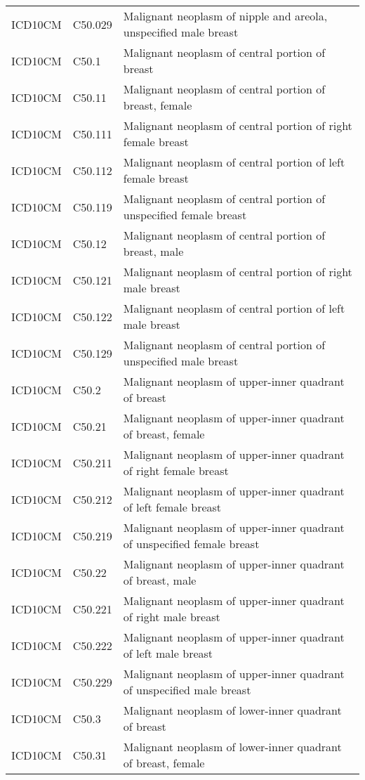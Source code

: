 \begin{table}[ht]
\begin{tabular}{lll}
  ICD10CM & C50.029 & Malignant neoplasm of nipple and areola, unspecified male breast \\ 
  ICD10CM & C50.1 & Malignant neoplasm of central portion of breast \\ 
  ICD10CM & C50.11 & Malignant neoplasm of central portion of breast, female \\ 
  ICD10CM & C50.111 & Malignant neoplasm of central portion of right female breast \\ 
  ICD10CM & C50.112 & Malignant neoplasm of central portion of left female breast \\ 
  ICD10CM & C50.119 & Malignant neoplasm of central portion of unspecified female breast \\ 
  ICD10CM & C50.12 & Malignant neoplasm of central portion of breast, male \\ 
  ICD10CM & C50.121 & Malignant neoplasm of central portion of right male breast \\ 
  ICD10CM & C50.122 & Malignant neoplasm of central portion of left male breast \\ 
  ICD10CM & C50.129 & Malignant neoplasm of central portion of unspecified male breast \\ 
  ICD10CM & C50.2 & Malignant neoplasm of upper-inner quadrant of breast \\ 
  ICD10CM & C50.21 & Malignant neoplasm of upper-inner quadrant of breast, female \\ 
  ICD10CM & C50.211 & Malignant neoplasm of upper-inner quadrant of right female breast \\ 
  ICD10CM & C50.212 & Malignant neoplasm of upper-inner quadrant of left female breast \\ 
  ICD10CM & C50.219 & Malignant neoplasm of upper-inner quadrant of unspecified female breast \\ 
  ICD10CM & C50.22 & Malignant neoplasm of upper-inner quadrant of breast, male \\ 
  ICD10CM & C50.221 & Malignant neoplasm of upper-inner quadrant of right male breast \\ 
  ICD10CM & C50.222 & Malignant neoplasm of upper-inner quadrant of left male breast \\ 
  ICD10CM & C50.229 & Malignant neoplasm of upper-inner quadrant of unspecified male breast \\ 
  ICD10CM & C50.3 & Malignant neoplasm of lower-inner quadrant of breast \\ 
  ICD10CM & C50.31 & Malignant neoplasm of lower-inner quadrant of breast, female \\ 

\end{tabular}
\end{table}
